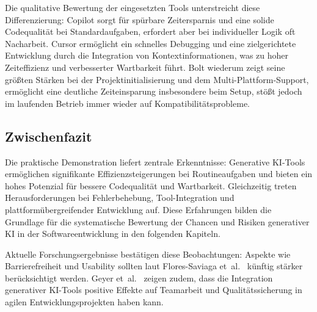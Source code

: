 Die qualitative Bewertung der eingesetzten Tools unterstreicht diese
Differenzierung: Copilot sorgt für spürbare Zeitersparnis und eine solide
Codequalität bei Standardaufgaben, erfordert aber bei individueller Logik oft
Nacharbeit. Cursor ermöglicht ein schnelles Debugging und eine zielgerichtete
Entwicklung durch die Integration von Kontextinformationen, was zu hoher
Zeiteffizienz und verbesserter Wartbarkeit führt. Bolt wiederum zeigt seine
größten Stärken bei der Projektinitialisierung und dem Multi-Plattform-Support,
ermöglicht eine deutliche Zeiteinsparung insbesondere beim Setup, stößt jedoch
im laufenden Betrieb immer wieder auf Kompatibilitätsprobleme.

\subsection{Zwischenfazit}

Die praktische Demonstration liefert zentrale Erkenntnisse: Generative KI-Tools
ermöglichen signifikante Effizienzsteigerungen bei Routineaufgaben und bieten
ein hohes Potenzial für bessere Codequalität und Wartbarkeit. Gleichzeitig
treten Herausforderungen bei Fehlerbehebung, Tool-Integration und
plattformübergreifender Entwicklung auf. Diese Erfahrungen bilden die Grundlage
für die systematische Bewertung der Chancen und Risiken generativer KI in der
Softwareentwicklung in den folgenden Kapiteln.

Aktuelle Forschungsergebnisse bestätigen diese Beobachtungen: Aspekte wie
Barrierefreiheit und Usability sollten laut Flores-Saviaga
et~al.~\cite{flores-saviaga_impact_2025} künftig stärker berücksichtigt werden.
Geyer et~al.~\cite{geyer_case_2025} zeigen zudem, dass die Integration
generativer KI-Tools positive Effekte auf Teamarbeit und Qualitätssicherung in
agilen Entwicklungsprojekten haben kann.

